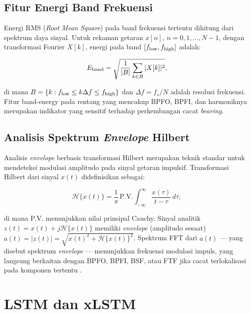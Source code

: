 \subsection{Fitur Energi Band Frekuensi}
\label{subsec:bab3_band_energy}

Energi RMS (\emph{Root Mean Square}) pada band frekuensi tertentu dihitung
dari spektrum daya sinyal. Untuk rekaman getaran $x[n]$, $n = 0, 1, \ldots, N-1$,
dengan transformasi Fourier $X[k]$, energi pada band $[f_{\rm low}, f_{\rm high}]$
adalah:

\begin{equation}\label{eq:bab3_band_energy}
  E_{\rm band} = \sqrt{\frac{1}{|B|} \sum_{k \in B} |X[k]|^2},
\end{equation}

\noindent di mana $B = \{k : f_{\rm low} \leq k\Delta f \leq f_{\rm high}\}$ dan
$\Delta f = f_s/N$ adalah resolusi frekuensi. Fitur band-energy pada rentang
yang mencakup BPFO, BPFI, dan harmoniknya merupakan indikator yang sensitif
terhadap perkembangan cacat \emph{bearing}.

\subsection{Analisis Spektrum \emph{Envelope} Hilbert}
\label{subsec:bab3_hilbert}

Analisis \emph{envelope} berbasis transformasi Hilbert merupakan teknik standar
untuk mendeteksi modulasi amplitudo pada sinyal getaran impulsif.
Transformasi Hilbert dari sinyal $x(t)$ didefinisikan sebagai:

\begin{equation}\label{eq:bab3_hilbert}
  \mathcal{H}\{x(t)\} = \frac{1}{\pi} \, \text{P.V.} \int_{-\infty}^{\infty}
    \frac{x(\tau)}{t - \tau} \, d\tau,
\end{equation}

\noindent di mana P.V. menunjukkan nilai prinsipal Cauchy. Sinyal analitik
$z(t) = x(t) + j\mathcal{H}\{x(t)\}$ memiliki \emph{envelope} (amplitudo
sesaat) $a(t) = |z(t)| = \sqrt{x(t)^2 + \mathcal{H}\{x(t)\}^2}$. Spektrum
FFT dari $a(t)$ --- yang disebut spektrum \emph{envelope} --- menunjukkan
frekuensi modulasi impuls, yang langsung berkaitan dengan BPFO, BPFI, BSF,
atau FTF jika cacat terlokalisasi pada komponen tertentu .

\section{LSTM dan xLSTM}
\label{sec:bab3_lstm_xlstm}

